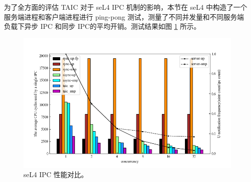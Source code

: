 为了全方面的评估 TAIC 对于 seL4 IPC 机制的影响，本节在 seL4 中构造了一个服务端进程和客户端进程进行 ping-pong 测试，测量了不同并发量和不同服务端负载下异步 IPC 和同步 IPC的平均开销。测试结果如图 \ref{figure:sel4-ipc-res} 所示。

\begin{figure}
    \centering
    \includegraphics[width=\textwidth]{figures/ipc_test.png}
    \caption[seL4 IPC 性能对比]{seL4 IPC 性能对比。}
    \label{figure:sel4-ipc-res}
\end{figure}




